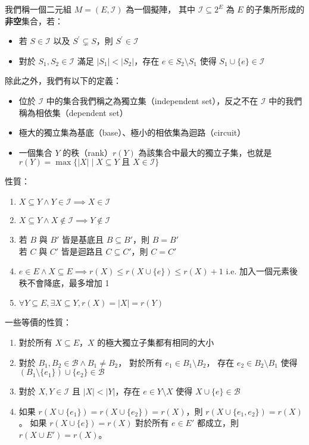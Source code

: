 我們稱一個二元組 $M = (E, \mathcal{I})$ 為一個擬陣，
其中 $\mathcal{I} \subseteq 2^E$ 為 $E$ 的子集所形成的\textbf{非空}集合，若：

\begin{itemize}
    \item 若 $S \in \mathcal{I}$ 以及 $S^\prime \subsetneq S$，則
        $S^\prime \in \mathcal{I}$
    \item 對於 $S_1, S_2 \in \mathcal{I}$ 滿足 $|S_1| < |S_2|$，存在
        $e \in S_2 \setminus S_1$ 使得 $S_1 \cup \{e\} \in \mathcal{I}$
\end{itemize}

除此之外，我們有以下的定義：

\begin{itemize}
    \item 位於 $\mathcal{I}$ 中的集合我們稱之為獨立集（independent set），反之不在
        $\mathcal{I}$ 中的我們稱為相依集（dependent set）
    \item 極大的獨立集為基底（base）、極小的相依集為迴路（circuit）
    \item 一個集合 $Y$ 的秩（rank）$r(Y)$ 為該集合中最大的獨立子集，也就是
        $r(Y) = \max\{|X| \mid X \subseteq Y \text{ 且 } X \in \mathcal{I} \}$
\end{itemize}

性質：
\begin{enumerate}
    \item $X \subseteq Y \land Y \in \mathcal I \implies X \in \mathcal I$
    \item $X \subseteq Y \land X \notin \mathcal I \implies Y \notin \mathcal I$
    \item 若 $B$ 與 $B'$ 皆是基底且 $B \subseteq B'$，則 $B=B'$\\
          若 $C$ 與 $C'$ 皆是迴路且 $C \subseteq C'$，則 $C=C'$
    \item $e \in E \land X \subseteq E \implies r(X) \leq r(X \cup \{e\}) \leq r(X) + 1$ i.e. 加入一個元素後秩不會降底，最多增加 1
    \item $\forall Y \subseteq E, \exists X \subseteq Y, r(X)=\lvert X \rvert = r(Y)$
\end{enumerate}

一些等價的性質：
\begin{enumerate}
    \item 對於所有 $X \subseteq E$，$X$ 的極大獨立子集都有相同的大小
    \item 對於 $B_1,B_2 \in \mathcal B \land B_1 \neq B_2$，
        對於所有 $e_1 \in B_1 \setminus B_2$，
        存在 $e_2 \in B_2 \setminus B_1$ 使得 $(B_1 \setminus \{e_1\}) \cup \{e_2\} \in \mathcal B$
    \item 對於 $X,Y \in \mathcal I$ 且 $\lvert X \rvert < \lvert Y \rvert$，存在 $e \in Y \setminus X$ 使得 $X \cup \{e\} \in \mathcal B$
    \item 如果 $r(X \cup \{e_1\}) = r(X \cup \{e_2\}) = r(X)$，則 $r(X \cup \{e_1,e_2\}) = r(X)$。
        如果 $r(X \cup \{e\}) = r(X)$ 對於所有 $e \in E'$ 都成立，則 $r(X \cup E') = r(X)$。
\end{enumerate}

